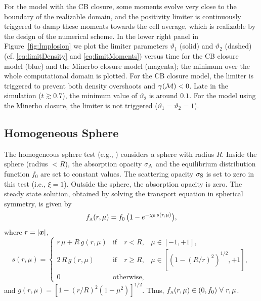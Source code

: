 For the model with the CB closure, some moments evolve very close to the boundary of the realizable domain, and the positivity limiter is continuously triggered to damp these moments towards the cell average, which is realizable by the design of the numerical scheme.  
In the lower right panel in Figure~\ref{fig:Implosion} we plot the limiter parameters $\vartheta_{1}$ (solid) and $\vartheta_{2}$ (dashed) (cf. \eqref{eq:limitDensity} and \eqref{eq:limitMoments}) versus time for the CB closure model (blue) and the Minerbo closure model (magenta); the minimum over the whole computational domain is plotted.  
For the CB closure model, the limiter is triggered to prevent both density overshoots and $\gamma(\mathcal{M})<0$.  
Late in the simulation ($t\gtrsim0.7$), the minimum value of $\vartheta_{2}$ is around $0.1$.  
For the model using the Minerbo closure, the limiter is not triggered ($\vartheta_{1}=\vartheta_{2}=1$).  

\subsection{Homogeneous Sphere}
\label{sec:homogeneousSphere}

The homogeneous sphere test (e.g., \cite{smit_etal_1997}) considers a sphere with radius $R$.  
Inside the sphere (radius $<R$), the absorption opacity $\sigma_{{\rm A}}$ and the equilibrium distribution function $f_{0}$ are set to constant values.  
The scattering opacity $\sigma_{{\rm S}}$ is set to zero in this test (i.e., $\xi=1$).  
Outside the sphere, the absorption opacity is zero.  
The steady state solution, obtained by solving the transport equation in spherical symmetry, is given by
\begin{equation}
  f_{\mbox{\tiny A}}(r,\mu)=f_{0}\,\big(1-e^{-\chi_{0}\,s(r,\mu)}\big),
  \label{eq:distributionHomogeneousSphere}
\end{equation}
where $r=|\boldsymbol{x}|$, 
\begin{equation}
  s(r,\mu)
  =\left\{
  \begin{array}{lll}
    r\,\mu+R\,g(r,\mu) & \mbox{if}\quad r<R, & \mu\in[-1,+1], \\
    2\,R\,g(r,\mu) & \mbox{if}\quad r \ge R, & \mu\in[(1-(R/r)^{2})^{1/2},+1], \\
    0 & \mbox{otherwise},
  \end{array}
  \right.
\end{equation}
and $g(r,\mu)=[1-(r/R)^{2}(1-\mu^{2})]^{1/2}$.  
Thus, $f_{\mbox{\tiny A}}(r,\mu)\in(0,f_{0})~\forall~r,\mu$.  

